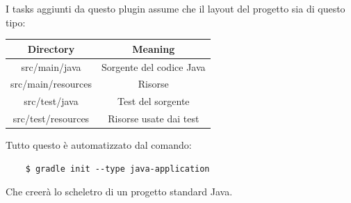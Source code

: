 I tasks aggiunti da questo plugin assume che il layout del progetto sia di questo tipo:
\begin{center}
\begin{tabular}{|c|c|}
\hline
Directory & Meaning  \\
\hline
\hline
    src/main/java & Sorgente del codice Java\\
    src/main/resources & Risorse \\
    src/test/java & Test del sorgente \\
    src/test/resources & Risorse usate dai test \\
\hline
\end{tabular}
\end{center}
Tutto questo è automatizzato dal comando:
\begin{verbatim}
    $ gradle init --type java-application\end{verbatim}
Che creerà lo scheletro di un progetto standard Java.